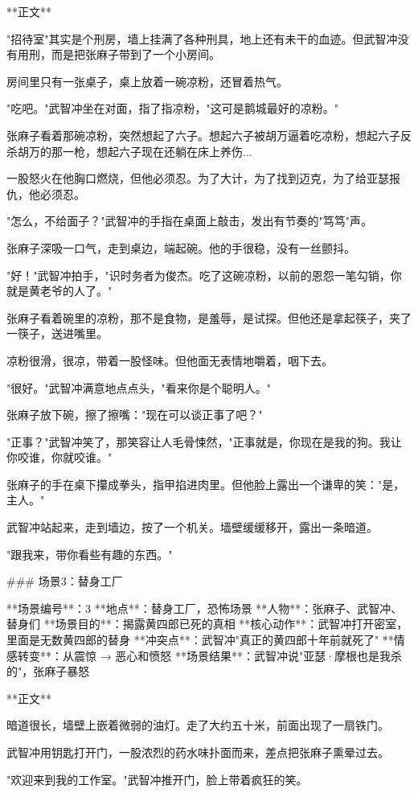 **正文**

"招待室"其实是个刑房，墙上挂满了各种刑具，地上还有未干的血迹。但武智冲没有用刑，而是把张麻子带到了一个小房间。

房间里只有一张桌子，桌上放着一碗凉粉，还冒着热气。

"吃吧。"武智冲坐在对面，指了指凉粉，"这可是鹅城最好的凉粉。"

张麻子看着那碗凉粉，突然想起了六子。想起六子被胡万逼着吃凉粉，想起六子反杀胡万的那一枪，想起六子现在还躺在床上养伤...

一股怒火在他胸口燃烧，但他必须忍。为了大计，为了找到迈克，为了给亚瑟报仇，他必须忍。

"怎么，不给面子？"武智冲的手指在桌面上敲击，发出有节奏的"笃笃"声。

张麻子深吸一口气，走到桌边，端起碗。他的手很稳，没有一丝颤抖。

"好！"武智冲拍手，"识时务者为俊杰。吃了这碗凉粉，以前的恩怨一笔勾销，你就是黄老爷的人了。"

张麻子看着碗里的凉粉，那不是食物，是羞辱，是试探。但他还是拿起筷子，夹了一筷子，送进嘴里。

凉粉很滑，很凉，带着一股怪味。但他面无表情地嚼着，咽下去。

"很好。"武智冲满意地点点头，"看来你是个聪明人。"

张麻子放下碗，擦了擦嘴："现在可以谈正事了吧？"

"正事？"武智冲笑了，那笑容让人毛骨悚然，"正事就是，你现在是我的狗。我让你咬谁，你就咬谁。"

张麻子的手在桌下攥成拳头，指甲掐进肉里。但他脸上露出一个谦卑的笑："是，主人。"

武智冲站起来，走到墙边，按了一个机关。墙壁缓缓移开，露出一条暗道。

"跟我来，带你看些有趣的东西。"

### 场景3：替身工厂

**场景编号**：3  
**地点**：替身工厂，恐怖场景  
**人物**：张麻子、武智冲、替身们  
**场景目的**：揭露黄四郎已死的真相  
**核心动作**：武智冲打开密室，里面是无数黄四郎的替身  
**冲突点**：武智冲"真正的黄四郎十年前就死了"  
**情感转变**：从震惊 → 恶心和愤怒  
**场景结果**：武智冲说"亚瑟·摩根也是我杀的"，张麻子暴怒

**正文**

暗道很长，墙壁上嵌着微弱的油灯。走了大约五十米，前面出现了一扇铁门。

武智冲用钥匙打开门，一股浓烈的药水味扑面而来，差点把张麻子熏晕过去。

"欢迎来到我的工作室。"武智冲推开门，脸上带着疯狂的笑。

